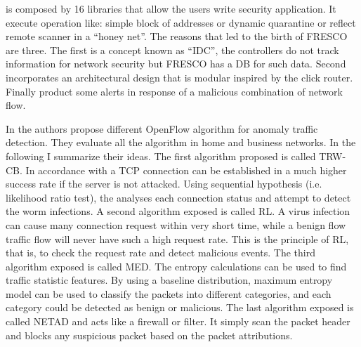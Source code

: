 is composed by 16 libraries that allow the users write security application. It execute operation like: simple block of addresses or dynamic quarantine or reflect remote scanner in a ``honey net''. The reasons that led to the birth of FRESCO are three. The first is a concept known as ``\ac{IDC}'', the controllers do not track information for network security but FRESCO has a \ac{DB} for such data. Second incorporates an architectural design that is modular inspired by the click router. Finally product some alerts in response of a malicious combination of network flow.

In \cite{sdn-anomaly-traffic-detection} the authors propose different OpenFlow algorithm for anomaly traffic detection. They evaluate all the algorithm in home and business networks. In the following I summarize their ideas. The first algorithm proposed is called \ac{TRW-CB}. In accordance with a \ac{TCP} connection can be established in a much higher success rate if the server is not attacked. Using sequential hypothesis (i.e. likelihood ratio test), the analyses each connection status and attempt to detect the worm infections. A second algorithm exposed is called \ac{RL}. A virus infection can cause many connection request within very short time, while a benign flow traffic flow will never have such a high request rate. This is the principle of \ac{RL}, that is, to check the request rate and  detect malicious events. The third algorithm exposed is called \ac{MED}. The entropy calculations can be used to find traffic statistic features. By using a baseline distribution, maximum entropy model can be used to classify the packets into different categories, and each category could be detected as benign or malicious. The last algorithm exposed is called \ac{NETAD} and acts like a firewall or filter. It simply scan the packet header and blocks any suspicious packet based on the packet attributions.